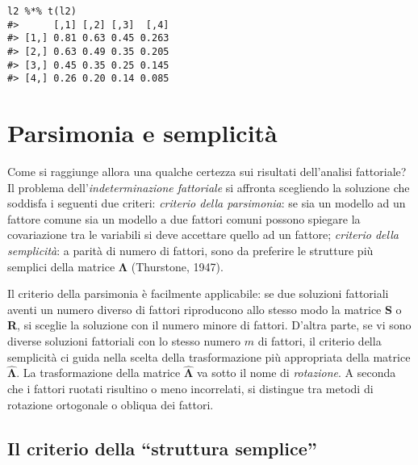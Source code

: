 \begin{exmp}
\begin{lstlisting}
l2 %*% t(l2)
#>      [,1] [,2] [,3]  [,4]
#> [1,] 0.81 0.63 0.45 0.263
#> [2,] 0.63 0.49 0.35 0.205
#> [3,] 0.45 0.35 0.25 0.145
#> [4,] 0.26 0.20 0.14 0.085
\end{lstlisting}
\end{exmp}

\section{Parsimonia e semplicità}

Come si raggiunge allora una qualche certezza sui risultati
dell'analisi fattoriale? Il problema dell'\textit{indeterminazione fattoriale} si affronta scegliendo la soluzione che soddisfa i seguenti due criteri:
\textit{criterio della parsimonia}: se sia un modello ad
un fattore comune sia un modello a due fattori comuni possono
spiegare la covariazione tra le variabili si deve accettare quello
ad un fattore;
 \textit{criterio della semplicit{\`a}}: a parit{\`a} di
numero di fattori, sono da preferire le strutture pi{\`u} semplici
della matrice $\boldsymbol{\Lambda}$ (Thurstone, 1947).

 Il criterio della parsimonia è facilmente applicabile: se due
soluzioni fattoriali aventi un numero diverso di fattori riproducono
allo stesso modo la matrice \textbf{S} o \textbf{R}, si sceglie la
soluzione con il numero minore di fattori. 
 D'altra parte, se vi sono diverse soluzioni fattoriali con lo stesso numero $m$ di fattori, il criterio della semplicità ci
guida nella scelta della trasformazione più appropriata della matrice
$\hat{\boldsymbol{\Lambda}}$.
 La trasformazione della matrice $\hat{\boldsymbol{\Lambda}}$ va sotto il nome di \textit{rotazione}. 
A seconda che i fattori ruotati risultino o meno incorrelati, si
distingue tra metodi di rotazione ortogonale o obliqua dei fattori.

\subsection{Il criterio della ``struttura semplice''}

